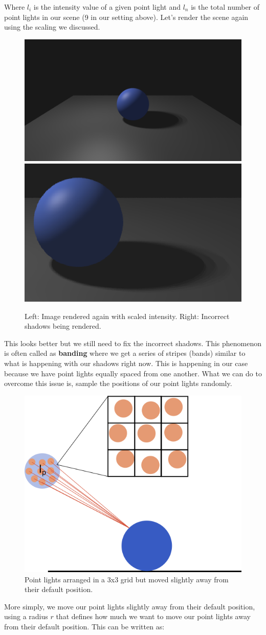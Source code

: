 \documentclass[11pt,a4paper]{article}
\begin{document}
 	\noindent
 	Where $l_{i}$ is the intensity value of a given point light and $l_{n}$ is the total number of point lights in our scene (9 in our setting above). Let's render the scene again using the scaling we discussed.
 	\begin{figure}[H]
 		\centering
 		\captionsetup{justification=centering}
 		\includegraphics[width=.4\textwidth]{arealight3}\quad
 		\includegraphics[width=.365\textwidth]{wrongshadows}\quad
 		\caption{Left: Image rendered again with scaled intensity. Right: Incorrect shadows being rendered.}
 	\end{figure}
 	\noindent
 	This looks better but we still need to fix the incorrect shadows. This phenomenon is often called as \textbf{banding} where we get a series of stripes (bands) similar to what is happening with our shadows right now. This is happening in our case because we have point lights equally spaced from one another. What we can do to overcome this issue is, sample the positions of our point lights randomly. 
 	\begin{figure}[H]
 		\centering
 		\captionsetup{justification=centering}
 		\includegraphics[width=.4\textwidth]{arealight4}\quad
 		\caption{Point lights arranged in a 3x3 grid but moved slightly away from their default position.}
 	\end{figure}
 	\noindent
 	More simply, we move our point lights slightly away from their default position, using a radius $r$ that defines how much we want to move our point lights away from their default position. This can be written as:
\end{document}
